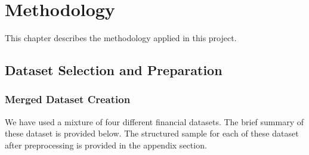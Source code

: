 \documentclass[logo,msc]{infthesis}           %
\begin{document}



\chapter{Methodology}
This chapter describes the methodology applied in this project. 

\section{Dataset Selection and Preparation}

\subsection{Merged Dataset Creation}

We have used a mixture of four different financial datasets. The brief summary of these dataset is provided below. The structured sample for each of these dataset after preprocessing is provided in the appendix section. 
\end{document}
